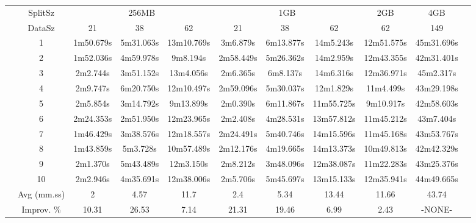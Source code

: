 \begin{tabularx}{\linewidth}{c|c|c|c|c|c|c|c|c|c|l|}
\cline{2-10}
& SplitSz 
& \multicolumn{3}{c|}{256MB} & \multicolumn{3}{c|}{1GB}  & \multicolumn{1}{c|}{2GB} & \multicolumn{1}{c|}{4GB} \\
\cline{2-10}
& DataSz 
& 21 & 38 & 62 & 21 & 38 & 62 & 62 & 149 \\
\cline{2-10}
& 1
& 1m50.679s & 5m31.063s & 13m10.769s & 3m6.879s & 6m13.877s & 14m5.243s & 12m51.575s & 45m31.696s \\
\cline{2-10}
& 2
& 1m52.036s & 4m59.978s & 9m8.194s & 2m58.449s & 5m26.362s & 14m2.959s & 12m43.355s & 42m31.401s \\
\cline{2-10}
& 3
& 2m2.744s & 3m51.152s & 13m4.056s & 2m6.365s & 6m8.137s & 14m6.316s & 12m36.971s & 45m2.317s \\
\cline{2-10}
& 4
& 2m9.747s & 6m20.750s & 12m10.497s & 2m59.096s & 5m30.037s & 12m1.829s & 11m4.499s & 43m29.198s \\
\cline{2-10}
& 5
& 2m5.854s & 3m14.792s & 9m13.899s & 2m0.390s & 6m11.867s & 11m55.725s & 9m10.917s & 42m58.603s \\
\cline{2-10}
& 6
& 2m24.353s & 2m51.950s & 12m23.965s & 2m2.408s & 4m28.531s & 13m57.812s & 11m45.212s & 43m7.404s \\
\cline{2-10}
& 7
& 1m46.429s & 3m38.576s & 12m18.557s & 2m24.491s & 5m40.746s & 14m15.596s & 11m45.168s & 43m53.767s \\
\cline{2-10}
& 8
& 1m43.859s & 5m3.728s & 10m57.489s & 2m12.176s & 4m19.665s & 14m13.373s & 10m49.813s & 42m42.329s \\
\cline{2-10}
& 9
& 2m1.370s & 5m43.489s & 12m3.150s & 2m8.212s & 3m48.096s & 12m38.087s & 11m22.283s & 43m25.376s \\
\cline{2-10}
& 10
& 2m2.946s & 4m35.691s & 12m38.006s & 2m5.706s & 5m45.697s & 13m15.133s & 12m35.941s & 44m49.665s \\
\cline{2-10}
& Avg (mm.ss)
& 2 & 4.57 & 11.7 & 2.4 & 5.34 & 13.44 & 11.66 & 43.74 \\
\cline{2-10}
& Improv. \%
& 10.31 & 26.53 & 7.14 & 21.31 & 19.46 & 6.99 & 2.43 & -NONE- \\
\cline{2-10}
\end{tabularx}
